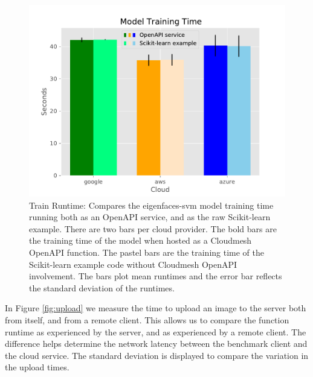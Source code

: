\begin{figure}[htb]
\centering

\includegraphics[width=\columnwidth]{images/sample_graph_2.pdf}

\caption{Train Runtime: Compares the eigenfaces-svm model training time
running both as an OpenAPI service, and as the raw Scikit-learn example.
There are two bars per cloud provider. The bold bars are the training
time of the model when hosted as a Cloudmesh OpenAPI function. The
pastel bars are the training time of the Scikit-learn example code
without Cloudmesh OpenAPI involvement. The bars plot mean runtimes and
the error bar reflects the standard deviation of the runtimes.}
\label{fig:4}
\end{figure}

In Figure \ref{fig:upload} we measure the time to upload an image to the server both
from itself, and from a remote client. This allows us to compare the
function runtime as experienced by the server, and as experienced by a
remote client. The difference helps determine the network latency
between the benchmark client and the cloud service. The standard
deviation is displayed to compare the variation in the upload times.

